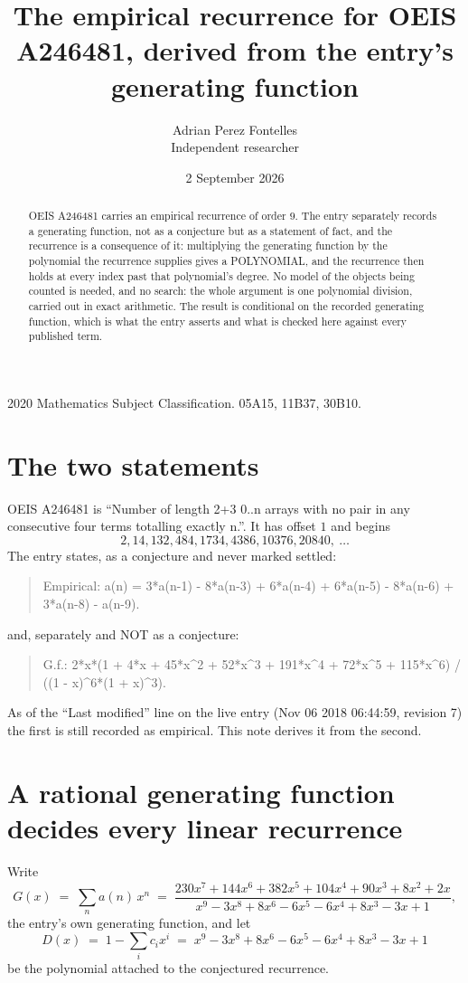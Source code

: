 \documentclass[11pt,a4paper]{article}
\title{The empirical recurrence for OEIS A246481, derived from the entry's generating function}
\author{Adrian Perez Fontelles\\ \small Independent researcher}
\date{2 September 2026}
\theoremstyle{plain}
\theoremstyle{definition}
\begin{document}
\maketitle

\begin{abstract}
OEIS A246481 carries an empirical recurrence of order $9$. The entry separately records a
generating function, not as a conjecture but as a statement of fact, and the recurrence is a
consequence of it: multiplying the generating function by the polynomial the recurrence
supplies gives a POLYNOMIAL, and the recurrence then holds at every index past that
polynomial's degree. No model of the objects being counted is needed, and no search: the
whole argument is one polynomial division, carried out in exact arithmetic. The result is
conditional on the recorded generating function, which is what the entry asserts and what is
checked here against every published term.
\end{abstract}

\noindent\small 2020 Mathematics Subject Classification. 05A15, 11B37, 30B10.\normalsize

\section{The two statements}

OEIS A246481 is ``Number of length 2+3 0..n arrays with no pair in any consecutive four terms totalling exactly n.''. It has offset $1$ and begins
\[
2, 14, 132, 484, 1734, 4386, 10376, 20840,\ \dots
\]
The entry states, as a conjecture and never marked settled:
\begin{quote}
Empirical: a(n) = 3*a(n-1) - 8*a(n-3) + 6*a(n-4) + 6*a(n-5) - 8*a(n-6) + 3*a(n-8) - a(n-9).
\end{quote}
and, separately and NOT as a conjecture:
\begin{quote}
G.f.: 2*x*(1 + 4*x + 45*x\^{}2 + 52*x\^{}3 + 191*x\^{}4 + 72*x\^{}5 + 115*x\^{}6) / ((1 - x)\^{}6*(1 + x)\^{}3).
\end{quote}
As of the ``Last modified'' line on the live entry (Nov 06 2018 06:44:59, revision 7) the first is still
recorded as empirical. This note derives it from the second.

\section{A rational generating function decides every linear recurrence}

Write
\[
G(x)\;=\;\sum_{n}a(n)\,x^{n}\;=\;\frac{230 x^{7} + 144 x^{6} + 382 x^{5} + 104 x^{4} + 90 x^{3} + 8 x^{2} + 2 x}{x^{9} - 3 x^{8} + 8 x^{6} - 6 x^{5} - 6 x^{4} + 8 x^{3} - 3 x + 1},
\]
the entry's own generating function, and let
\[
D(x)\;=\;1-\sum_i c_i x^{i}\;=\;x^{9} - 3 x^{8} + 8 x^{6} - 6 x^{5} - 6 x^{4} + 8 x^{3} - 3 x + 1
\]
be the polynomial attached to the conjectured recurrence.
\end{document}
